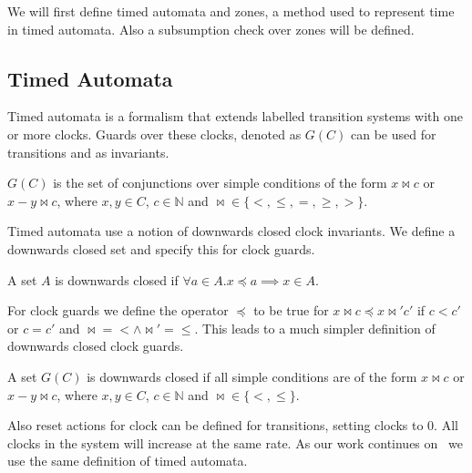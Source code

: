 We will first define timed automata and zones, a method used to represent time in timed automata. Also a subsumption check over zones will be defined. 

\subsection{Timed Automata}
Timed automata is a formalism that extends labelled transition systems with one or more clocks. Guards over these clocks, denoted as $G(C)$ can be used for transitions and as invariants. 

\begin{mydef}
\label{def:clockGuards}
$G(C)$ is the set of conjunctions over simple conditions of the form $x \Join c$ or $x-y \Join c$, where $x,y \in C$, $c \in \mathbb{N}$ and $\Join \in \{<,\leq,=,\geq,>\}$.
\end{mydef}

Timed automata use a notion of downwards closed clock invariants. We define a downwards closed set and specify this for clock guards.

\begin{mydef}
A set $A$ is downwards closed if $\forall a \in A. x \preceq a \implies x \in A$. 
\end{mydef}

For clock guards we define the operator $\preceq$ to be true for $x \Join c \preceq x \Join' c'$ if $c < c'$ or $c = c'$ and $\Join = < \wedge \Join' = \leq$. This leads to a much simpler definition of downwards closed clock guards.

\begin{mydef}
A set $G(C)$ is downwards closed if all simple conditions are of the form $x \Join c$ or $x-y \Join c$, where $x,y \in C$, $c \in \mathbb{N}$ and $\Join \in \{<,\leq\}$.
\end{mydef}


Also reset actions for clock can be defined for transitions, setting clocks to $0$. All clocks in the system will increase at the same rate. As our work continues on~\cite{eemcs21972} we use the same definition of timed automata.

